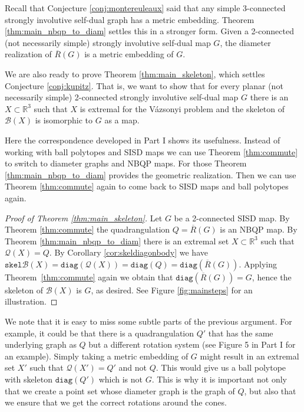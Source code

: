 \documentclass[10pt,a4paper]{article}
\newcounter{example}
\newcommand{\R}[0]{\mathbb{R}}
\newcommand{\Bc}[0]{\mathcal{B}}
\newcommand{\skel}[0]{\mathtt{skel}}
\newcommand{\diag}[0]{\mathtt{diag}}
\newcommand{\qt}{\mathcal{Q}}
\begin{document}
Recall that Conjecture \ref{conj:montereuleaux} said that any simple 3-connected strongly involutive self-dual graph has a metric embedding. Theorem \ref{thm:main_nbqp_to_diam} settles this in a stronger form. Given a 2-connected (not necessarily simple) strongly involutive self-dual map $G$, the diameter realization of $\overline{R}(G)$ is a metric embedding of $G$. 

We are also ready to prove Theorem \ref{thm:main_skeleton}, which settles Conjecture \ref{conj:kupitz}. That is, we want to show that for every planar (not necessarily simple) 2-connected strongly involutive self-dual map $G$ there is an $X\subset \R^3$ such that $X$ is extremal for the Vázsonyi problem and the skeleton of $\Bc(X)$ is  isomorphic to $G$ as a map. 

Here the correspondence developed in Part I shows its usefulness. Instead of working with ball polytopes and SISD maps we can use Theorem \ref{thm:commute} to switch to diameter graphs and NBQP maps. For those Theorem \ref{thm:main_nbqp_to_diam} provides the geometric realization. Then we can use Theorem \ref{thm:commute} again to come back to SISD maps and ball polytopes again. 

\begin{proof}[Proof of Theorem \ref{thm:main_skeleton}]

Let $G$ be a 2-connected SISD map. By Theorem \ref{thm:commute} the quadrangulation $Q=\overline R(G)$ is an NBQP map. By Theorem \ref{thm:main_nbqp_to_diam} there is an extremal set $X\subset\R^3$ such that $\qt(X)=Q$. By Corollary \ref{cor:skeldiagonbody} we have $\skel\Bc(X)=\diag(\qt(X))=\diag(Q)=\diag(\overline R(G))$. Applying Theorem~\ref{thm:commute} again we obtain that $\diag(\overline R(G))=G$, hence the skeleton of $\Bc(X)$ is $G$, as desired. See Figure \ref{fig:mainsteps} for an illustration.
 
\end{proof}


We note that it is easy to miss some subtle parts of the previous argument. For example, it could be that there is a quadrangulation $Q'$ that has the same underlying graph as $Q$ but a different rotation system (see Figure 5 in Part I for an example). Simply taking a metric embedding of $G$ might result in an extremal set $X'$ such that $\qt(X')=Q'$ and not $Q$. This would give us a ball polytope with skeleton $\diag(Q')$ which is not $G$. This is why it is important not only that we create a point set whose diameter graph is the graph of $Q$, but also that we ensure that we get the correct rotations around the cones. 
\end{document}
